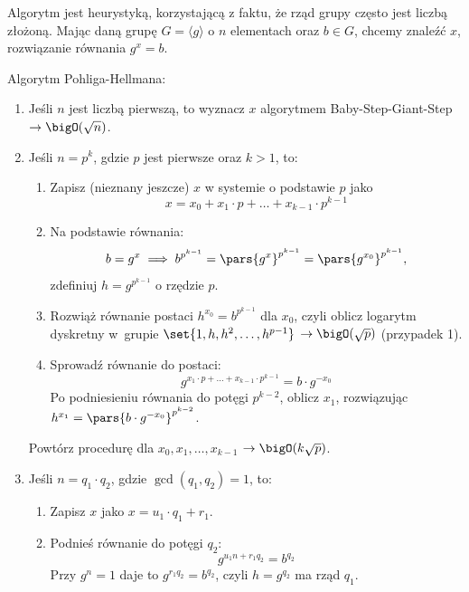 Algorytm jest heurystyką, korzystającą z faktu, że rząd grupy często jest liczbą złożoną. Mając daną grupę \( G = \langle g \rangle \) o \( n \) elementach oraz \( b \in G \), chcemy znaleźć \( x \), rozwiązanie równania \( g^x = b \).
\begin{greyframe}
	Algorytm Pohliga-Hellmana:
	\begin{enumerate}
		\item Jeśli \( n \) jest liczbą pierwszą, to wyznacz \( x \) algorytmem Baby-Step-Giant-Step \\ \( \rightarrow \bigO(\sqrt{n}) \).
		\item Jeśli \( n = p^k \), gdzie \( p \) jest pierwsze oraz \( k > 1 \), to:
		      \begin{enumerate}
			      \item Zapisz (nieznany jeszcze) \( x \) w systemie o podstawie \( p \) jako
			            \[
				            x = x_0 + x_1 \cdot p + \ldots + x_{k-1} \cdot p^{k-1}
			            \]
			      \item Na podstawie równania:
			            \[
				            b = g^x \implies b^{p^{k-1}} = \pars{g^x}^{p^{k-1}} = \pars{g^{x_0}}^{p^{k-1}},
			            \]
			            zdefiniuj \( h = g^{p^{k-1}} \) o rzędzie \( p \).
			      \item Rozwiąż równanie postaci \( h^{x_0} = b^{p^{k-1}} \) dla \( x_0 \), czyli oblicz logarytm dyskretny w~grupie \( \set{1, h, h^2, \ldots, h^{p-1}} \) \( \rightarrow \bigO(\sqrt{p}) \) (przypadek 1).
			      \item Sprowadź równanie do postaci:
			            \[
				            g^{x_1 \cdot p + \ldots + x_{k-1} \cdot p^{k-1}} = b \cdot g^{-x_0}
			            \]
			            Po podniesieniu równania do potęgi \( p^{k-2} \), oblicz \( x_1 \), rozwiązując \( h^{x_1} = \pars{b \cdot g^{-x_0}}^{p^{k-2}} \).
		      \end{enumerate}
		      Powtórz procedurę dla \( x_0, x_1, \ldots, x_{k-1} \) \( \rightarrow \bigO(k \sqrt{p}) \).
		\item Jeśli \( n  = q_1 \cdot q_2 \), gdzie \( \gcd(q_1, q_2) = 1 \), to:
		      \begin{enumerate}
			      \item Zapisz \( x \) jako \( x = u_1 \cdot q_1 + r_1 \).
			      \item Podnieś równanie do potęgi \( q_2\):
			            \[
				            g^{u_1n + r_1q_2} = b^{q_2}
			            \]
			            Przy \( g^n = 1 \) daje to \( g^{r_1 q_2} = b^{q_2} \), czyli \( h = g^{q_2} \) ma rząd \( q_1 \).

\end{enumerate}
\end{enumerate}
\end{greyframe}
